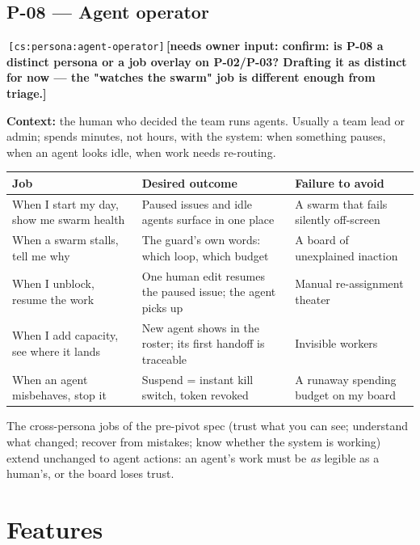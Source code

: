 \documentclass[11pt,a4paper]{report}
\newcommand{\cs}[1]{\,\texttt{\scriptsize[cs:#1]}\label{cs:#1}}
\newcommand{\owner}[1]{\,\textcolor{red!60!black}{\textbf{[needs owner input: #1]}}}
\begin{document}
\section{P-08 — Agent operator}
\cs{persona:agent-operator}\owner{confirm: is P-08 a distinct persona or a
  job overlay on P-02/P-03? Drafting it as distinct for now --- the
  "watches the swarm" job is different enough from triage.}

\textbf{Context:} the human who decided the team runs agents. Usually a
team lead or admin; spends minutes, not hours, with the system: when
something pauses, when an agent looks idle, when work needs re-routing.

\begin{center}
\begin{tabular}{@{}p{}p{}p{}@{}}
\toprule
\textbf{Job} & \textbf{Desired outcome} & \textbf{Failure to avoid}\\
\midrule
When I start my day, show me swarm health & Paused issues and idle agents
  surface in one place & A swarm that fails silently off-screen\\
When a swarm stalls, tell me why & The guard's own words: which loop,
  which budget & A board of unexplained inaction\\
When I unblock, resume the work & One human edit resumes the paused issue;
  the agent picks up & Manual re-assignment theater\\
When I add capacity, see where it lands & New agent shows in the roster;
  its first handoff is traceable & Invisible workers\\
When an agent misbehaves, stop it & Suspend = instant kill switch, token
  revoked & A runaway spending budget on my board\\
\bottomrule
\end{tabular}
\end{center}

The cross-persona jobs of the pre-pivot spec (trust what you can see;
understand what changed; recover from mistakes; know whether the system
is working) extend unchanged to agent actions: an agent's work must be
\emph{as} legible as a human's, or the board loses trust.

\chapter{Features}
\label{ch:features}
\end{document}
